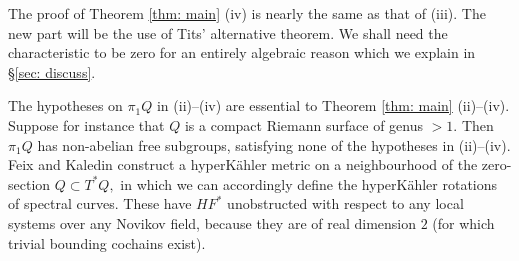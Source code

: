 \documentclass{article}
\theoremstyle{plain}%
\theoremstyle{definition}
\numberwithin{equation}{section}
\numberwithin{figure}{section}
\def\RP{{\mathbin{\mathbb{R}}}P}
\def\Q{{\mathbin{\mathbb Q}}}
\begin{document}
The proof of Theorem \ref{thm: main} (iv) is nearly the same as that of (iii). The new part will be the use of Tits' alternative theorem. We shall need the characteristic to be zero for an entirely algebraic reason which we explain in \S\ref{sec: discuss}.



The hypotheses on $\pi_1Q$ in (ii)--(iv) are essential to Theorem \ref{thm: main} (ii)--(iv). Suppose for instance that $Q$ is a compact Riemann surface of genus $>1.$ Then $\pi_1Q$ has non-abelian free subgroups, satisfying none of the hypotheses in (ii)--(iv). Feix \cite{Fx} and Kaledin \cite{Kal} construct a hyperK\"ahler metric on a neighbourhood of the zero-section $Q\subset T^*Q,$ in which we can accordingly define the hyperK\"ahler rotations of spectral curves. These have $HF^*$ unobstructed with respect to any local systems over any Novikov field, because they are of real dimension $2$ (for which trivial bounding cochains exist). 

\end{document}
